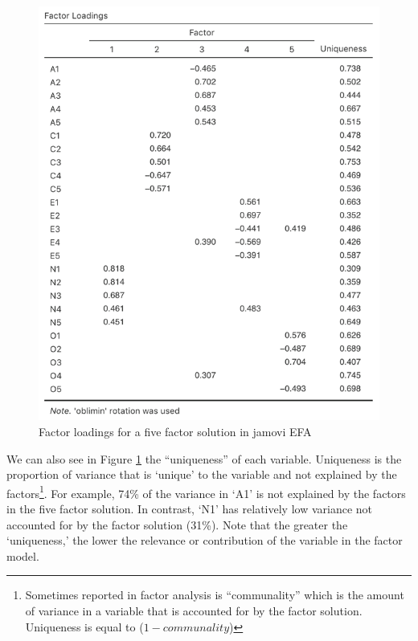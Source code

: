 \documentclass[
]{book}
\begin{document}
\begin{figure}

{\centering \includegraphics[width=1\linewidth]{img/factoranalysis/fa7} 

}

\caption{Factor loadings for a five factor solution in jamovi EFA}\label{fig:fa7}
\end{figure}

We can also see in Figure \ref{fig:fa7} the ``uniqueness'' of each variable. Uniqueness is the proportion of variance that is `unique' to the variable and not explained by the factors\footnote{Sometimes reported in factor analysis is ``communality'' which is the amount of variance in a variable that is accounted for by the factor solution. Uniqueness is equal to (\(1-communality\))}. For example, 74\% of the variance in `A1' is not explained by the factors in the five factor solution. In contrast, `N1' has relatively low variance not accounted for by the factor solution (31\%). Note that the greater the `uniqueness,' the lower the relevance or contribution of the variable in the factor model.
\end{document}
